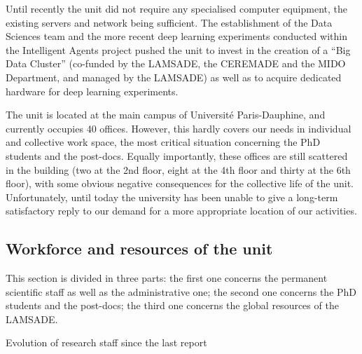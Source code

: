 Until recently the unit did not require any specialised computer equipment, the existing servers and network being sufficient. The establishment of the Data Sciences team and the more recent deep learning experiments conducted within the Intelligent Agents project pushed the unit to invest in the creation of a ``Big Data Cluster'' (co-funded by the LAMSADE, the CEREMADE and the MIDO Department, and managed by the LAMSADE) as well as to acquire dedicated hardware for deep learning experiments.

The unit is located at the main campus of Université Paris-Dauphine, and currently occupies 40 offices. However, this hardly covers our needs in individual and collective work space, the most critical situation concerning the PhD students and the post-docs. Equally importantly, these offices are still scattered in the building (two at the 2nd floor, eight at the 4th floor and thirty at the 6th floor), with some obvious negative consequences for the collective life of the unit. Unfortunately, until today the university has been unable to give a long-term satisfactory reply to our demand for a more appropriate location of our activities.

\subsection{Workforce and resources of the unit}\label{workforce}

This section is divided in three parts: the first one concerns the permanent scientific staff as well as the administrative one; the second one concerns the PhD students and the post-docs; the third one concerns the global resources of the LAMSADE.

\begin{table}
  \centering
  \caption{Evolution of research staff since the last report}\label{stafovertime}
\end{table}

